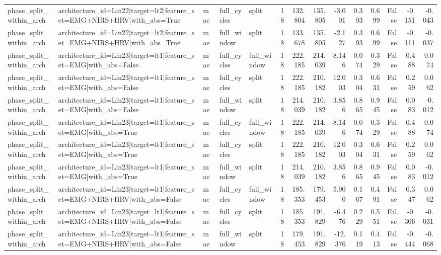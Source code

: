 \begin{table}
\begin{tabular}{lllllrrrrrrrrr}
phase_split_within_arch & architecture_id=Lin22|target=lt2|feature_set=EMG+NIRS+HRV|with_abs=True & mae & full_cycles & split & 18 & 132.804 & 135.805 & -3.001 & 0.393 & 0.699 & False & -0.151 & -0.043 \\
phase_split_within_arch & architecture_id=Lin22|target=lt2|feature_set=EMG+NIRS+HRV|with_abs=True & mae & full_window & split & 18 & 133.678 & 135.805 & -2.127 & 0.393 & 0.699 & False & -0.111 & -0.037 \\
phase_split_within_arch & architecture_id=Lin23|target=lt1|feature_set=EMG|with_abs=False & mae & full_cycles & full_window & 18 & 222.185 & 214.039 & 8.146 & 0.074 & 0.329 & False & 0.488 & 0.074 \\
phase_split_within_arch & architecture_id=Lin23|target=lt1|feature_set=EMG|with_abs=False & mae & full_cycles & split & 18 & 222.185 & 210.182 & 12.003 & 0.304 & 0.631 & False & 0.259 & 0.062 \\
phase_split_within_arch & architecture_id=Lin23|target=lt1|feature_set=EMG|with_abs=False & mae & full_window & split & 18 & 214.039 & 210.182 & 3.856 & 0.865 & 0.945 & False & 0.083 & -0.012 \\
phase_split_within_arch & architecture_id=Lin23|target=lt1|feature_set=EMG|with_abs=True & mae & full_cycles & full_window & 18 & 222.185 & 214.039 & 8.146 & 0.074 & 0.329 & False & 0.488 & 0.074 \\
phase_split_within_arch & architecture_id=Lin23|target=lt1|feature_set=EMG|with_abs=True & mae & full_cycles & split & 18 & 222.185 & 210.182 & 12.003 & 0.304 & 0.631 & False & 0.259 & 0.062 \\
phase_split_within_arch & architecture_id=Lin23|target=lt1|feature_set=EMG|with_abs=True & mae & full_window & split & 18 & 214.039 & 210.182 & 3.856 & 0.865 & 0.945 & False & 0.083 & -0.012 \\
phase_split_within_arch & architecture_id=Lin23|target=lt1|feature_set=EMG+NIRS+HRV|with_abs=False & mae & full_cycles & full_window & 18 & 185.353 & 179.453 & 5.900 & 0.167 & 0.491 & False & 0.347 & 0.062 \\
phase_split_within_arch & architecture_id=Lin23|target=lt1|feature_set=EMG+NIRS+HRV|with_abs=False & mae & full_cycles & split & 18 & 185.353 & 191.829 & -6.476 & 0.229 & 0.551 & False & -0.306 & -0.031 \\
phase_split_within_arch & architecture_id=Lin23|target=lt1|feature_set=EMG+NIRS+HRV|with_abs=False & mae & full_window & split & 18 & 179.453 & 191.829 & -12.376 & 0.119 & 0.413 & False & -0.444 & -0.068 \\

\end{tabular}
\end{table}
